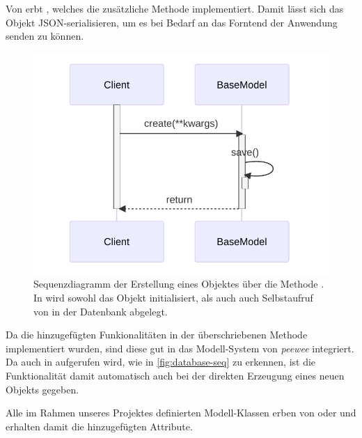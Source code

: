 Von  erbt , welches die zusätzliche Methode  implementiert. Damit lässt sich das Objekt JSON-serialisieren, um es bei Bedarf an das Forntend der Anwendung senden zu können.

\begin{figure}[!ht]
	\centering
	\includegraphics[width=0.75\linewidth]{images/diagrams/database-seq.pdf}
	\caption{Sequenzdiagramm der Erstellung eines Objektes über die Methode . In  wird sowohl das Objekt initialisiert, als auch auch Selbstaufruf von  in der Datenbank abgelegt.}
	\label{fig:database-seq}
\end{figure}

Da die hinzugefügten Funkionalitäten in der überschriebenen Methode  implementiert wurden, sind diese gut in das Modell-System von \emph{peewee} integriert. Da  auch in  aufgerufen wird, wie in \autoref{fig:database-seq} zu erkennen, ist die Funktionalität damit automatisch auch bei der direkten Erzeugung eines neuen Objekts gegeben.

Alle im Rahmen unseres Projektes definierten Modell-Klassen erben von  oder  und erhalten damit die hinzugefügten Attribute.